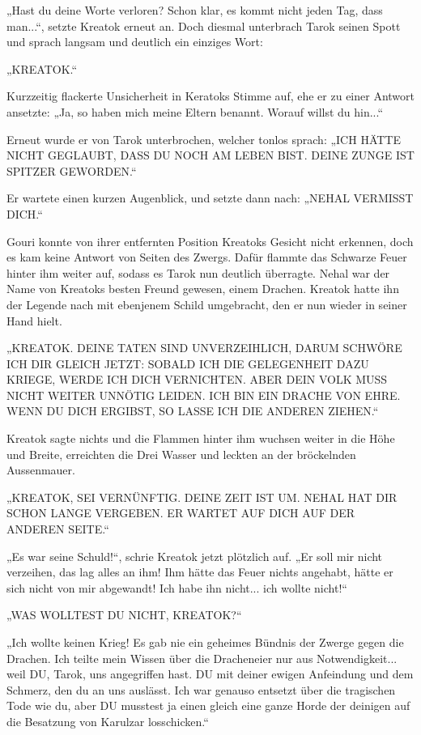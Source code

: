 „Hast du deine Worte verloren? Schon klar, es kommt nicht jeden Tag, dass man...“, setzte Kreatok erneut an. Doch diesmal unterbrach Tarok seinen Spott und sprach langsam und deutlich ein einziges Wort:

„KREATOK.“

Kurzzeitig flackerte Unsicherheit in Keratoks Stimme auf, ehe er zu einer Antwort ansetzte: „Ja, so haben mich meine Eltern benannt. Worauf willst du hin...“

Erneut wurde er von Tarok unterbrochen, welcher tonlos sprach: „ICH HÄTTE NICHT GEGLAUBT, DASS DU NOCH AM LEBEN BIST. DEINE ZUNGE IST SPITZER GEWORDEN.“

Er wartete einen kurzen Augenblick, und setzte dann nach: „NEHAL VERMISST DICH.“

Gouri konnte von ihrer entfernten Position Kreatoks Gesicht nicht erkennen, doch es kam keine Antwort von Seiten des Zwergs. Dafür flammte das Schwarze Feuer hinter ihm weiter auf, sodass es Tarok nun deutlich überragte. Nehal war der Name von Kreatoks besten Freund gewesen, einem Drachen. Kreatok hatte ihn der Legende nach mit ebenjenem Schild umgebracht, den er nun wieder in seiner Hand hielt.

„KREATOK. DEINE TATEN SIND UNVERZEIHLICH, DARUM SCHWÖRE ICH DIR GLEICH JETZT: SOBALD ICH DIE GELEGENHEIT DAZU KRIEGE, WERDE ICH DICH VERNICHTEN. ABER DEIN VOLK MUSS NICHT WEITER UNNÖTIG LEIDEN. ICH BIN EIN DRACHE VON EHRE. WENN DU DICH ERGIBST, SO LASSE ICH DIE ANDEREN ZIEHEN.“

Kreatok sagte nichts und die Flammen hinter ihm wuchsen weiter in die Höhe und Breite, erreichten die Drei Wasser und leckten an der bröckelnden Aussenmauer.

„KREATOK, SEI VERNÜNFTIG. DEINE ZEIT IST UM. NEHAL HAT DIR SCHON LANGE VERGEBEN. ER WARTET AUF DICH AUF DER ANDEREN SEITE.“

„Es war seine Schuld!“, schrie Kreatok jetzt plötzlich auf. „Er soll mir nicht verzeihen, das lag alles an ihm! Ihm hätte das Feuer nichts angehabt, hätte er sich nicht von mir abgewandt! Ich habe ihn nicht... ich wollte nicht!“

„WAS WOLLTEST DU NICHT, KREATOK?“

„Ich wollte keinen Krieg! Es gab nie ein geheimes Bündnis der Zwerge gegen die Drachen. Ich teilte mein Wissen über die Dracheneier nur aus Notwendigkeit... weil DU, Tarok, uns angegriffen hast. DU mit deiner ewigen Anfeindung und dem Schmerz, den du an uns auslässt. Ich war genauso entsetzt über die tragischen Tode wie du, aber DU musstest ja einen gleich eine ganze Horde der deinigen auf die Besatzung von Karulzar losschicken.“

